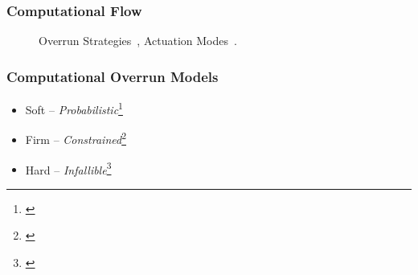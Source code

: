 \begin{frame}
    \frametitle{Computational Flow}
    \begin{figure}[h]
        \centering
        \only<2>{}%
        \only<3>{}%
        \caption{Overrun Strategies~\parencite{Cervin:2005}, Actuation Modes~\parencite{Schenato:2009}.}
    \end{figure}
\end{frame}

\begin{frame}
    \frametitle{Computational Overrun Models}
    \begin{itemize}\setlength\itemsep{1em}
        \item \textcolor<2>{lqgcolour!50!white}{Soft -- \emph{Probabilistic}\footnote{\cite{Buttazzo:2005, Manolache:2004, vonderBrueggen:2021}}}
        \item \textcolor<2>{lqgcolour}{Firm -- \emph{Constrained}\footnote{\cite{Koren:1995, Bernat:2001}}}
        \item<1> Hard -- \emph{Infallible}\footnote{\cite{Liu:1973}}
    \end{itemize}
\end{frame}

